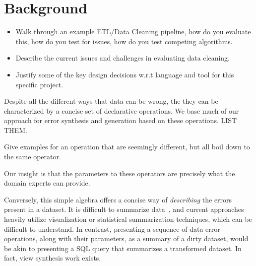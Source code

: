 \section{Background}

\begin{itemize}
    \item Walk through an example ETL/Data Cleaning pipeline, how do you evaluate this, how do you test for issues, how do you test competing algorithms.
    \item Describe the current issues and challenges in evaluating data cleaning.
    \item Justify some of the key design decisions w.r.t language and tool for this specific project.
\end{itemize}


Despite all the different ways that data can be wrong, the they can be characterized by a concise set of declarative operations.  We base much of our approach for error synthesis and generation based on these operations.  LIST THEM.

Give examples for an operation that are seemingly different, but all boil down to the same operator.

Our insight is that the parameters to these operators are precisely what the domain experts can provide.

Conversely, this simple algebra offers a concise way of {\it describing} the errors present in a dataset.  It is difficult to summarize data~\cite{bhardwaj2015collaborative}, and current approaches heavily utilize visualization or statistical summarization techniques, which can be difficult to understand.  In contrast, presenting a sequence of data error operations, along with their parameters, as a summary of a dirty dataset, would be akin to presenting a SQL query that summarizes a transformed dataset.  In fact, view synthesis work exists.


